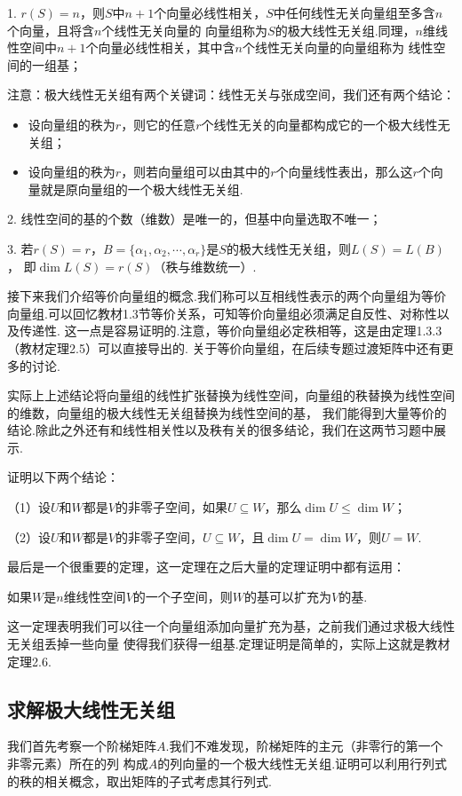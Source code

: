 1. $r(S)=n$，则$S$中$n+1$个向量必线性相关，$S$中任何线性无关向量组至多含$n$个向量，且将含$n$个线性无关向量的
向量组称为$S$的极大线性无关组.同理，$n$维线性空间中$n+1$个向量必线性相关，其中含$n$个线性无关向量的向量组称为
线性空间的一组基；

注意：极大线性无关组有两个关键词：线性无关与张成空间，我们还有两个结论：
\begin{itemize}
	\item 设向量组的秩为$r$，则它的任意$r$个线性无关的向量都构成它的一个极大线性无关组；
	\item 设向量组的秩为$r$，则若向量组可以由其中的$r$个向量线性表出，那么这$r$个向量就是原向量组的一个极大线性无关组.
\end{itemize}

2. 线性空间的基的个数（维数）是唯一的，但基中向量选取不唯一；

3. 若$r(S)=r$，$B=\{\alpha_1,\alpha_2,\cdots,\alpha_r\}$是$S$的极大线性无关组，则$L(S)=L(B)$，
即$\dim L(S)=r(S)$（秩与维数统一）.

接下来我们介绍等价向量组的概念.我们称可以互相线性表示的两个向量组为等价向量组.可以回忆教材1.3节等价关系，可知等价向量组必须满足自反性、对称性以及传递性.
这一点是容易证明的.注意，等价向量组必定秩相等，这是由定理1.3.3（教材定理2.5）可以直接导出的.
关于等价向量组，在后续专题过渡矩阵中还有更多的讨论.

实际上上述结论将向量组的线性扩张替换为线性空间，向量组的秩替换为线性空间的维数，向量组的极大线性无关组替换为线性空间的基，
我们能得到大量等价的结论.除此之外还有和线性相关性以及秩有关的很多结论，我们在这两节习题中展示.
\begin{example}
	证明以下两个结论：

	\textup{（1）}设$U$和$W$都是$V$的非零子空间，如果$U\subseteq W$，那么$\dim U \le \dim W$；
	
	\textup{（2）}设$U$和$W$都是$V$的非零子空间，$U\subseteq W$，且$\dim U = \dim W$，则$U = W$.
\end{example}
最后是一个很重要的定理，这一定理在之后大量的定理证明中都有运用：
\begin{theorem}
	如果$W$是$n$维线性空间$V$的一个子空间，则$W$的基可以扩充为$V$的基.
\end{theorem}
这一定理表明我们可以往一个向量组添加向量扩充为基，之前我们通过求极大线性无关组丢掉一些向量
使得我们获得一组基.定理证明是简单的，实际上这就是教材定理2.6.
\subsection{求解极大线性无关组}
我们首先考察一个阶梯矩阵$A$.我们不难发现，阶梯矩阵的主元（非零行的第一个非零元素）所在的列
构成$A$的列向量的一个极大线性无关组.证明可以利用行列式的秩的相关概念，取出矩阵的子式考虑其行列式.

